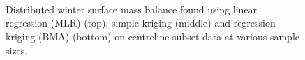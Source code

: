 \documentclass[12pt]{article}
\begin{document}
\begin{figure}[H]
	\centering
	\\
	\\
	\\
	\caption{Distributed winter surface mass balance found using linear regression (MLR) (top), simple kriging (middle) and regression kriging (BMA) (bottom) on centreline subset data at various sample sizes. }
	\label{fig:SubsetMeanSWE_samplesizeNdensity_centreline}
\end{figure}
\end{document}
